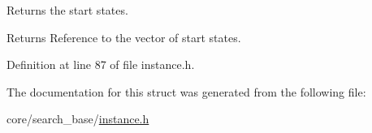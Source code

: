 Returns the start states. 

\begin{DoxyReturn}{Returns}
Reference to the vector of start states. 
\end{DoxyReturn}


Definition at line 87 of file instance.\+h.



The documentation for this struct was generated from the following file\+:\begin{DoxyCompactItemize}
\item 
core/search\+\_\+base/\hyperlink{instance_8h}{instance.\+h}\end{DoxyCompactItemize}
